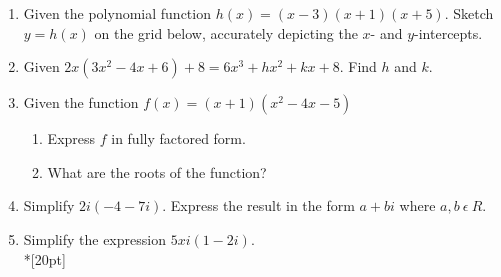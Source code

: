 \documentclass[12pt, oneside]{article}
\begin{document}
\begin{enumerate}
\newpage

\item Given the polynomial function $h(x)=(x-3)(x+1)(x+5)$. Sketch $y = h(x)$ on the grid below, accurately depicting the $x$- and $y$-intercepts.
\begin{center}
\end{center}

\item Given $2x(3x^2-4x+6)+8=6x^3+hx^2+kx+8$. Find $h$ and $k$.\\[80pt]

\item Given the function $f(x)=(x+1)(x^2-4x-5)$
\begin{enumerate}
    \item Express $f$ in fully factored form.\\[40pt]
    \item What are the roots of the function?\\[30pt]
\end{enumerate}


\item Simplify $2i(-4-7i)$. Express the result in the form $a+bi$ where $a,b \ \epsilon \ R$.\\[30pt]

\item Simplify the expression $5xi(1-2i)$.\\*[20pt]



\end{enumerate}
\end{document}
